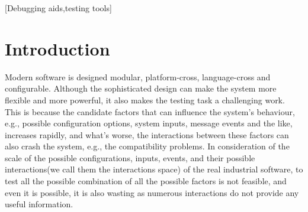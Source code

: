 \documentclass{sig-alternate}
\begin{document}
\begin{abstract}
\end{abstract}

[Debugging aids,testing tools]



\section{Introduction}

Modern software is designed modular, platform-cross, language-cross and configurable. Although the sophisticated design can make the system more flexible and more powerful, it also makes the testing task a challenging work. This is because the candidate factors that can influence the system's behaviour, e.g., possible configuration options, system inputs, message events and the like, increases rapidly, and what's worse, the interactions between these factors can also crash the system, e.g., the compatibility problems. In consideration of the scale of the possible configurations, inputs, events, and their possible interactions(we call them the interactions space) of the real industrial software, to test all the possible combination of all the possible factors is not feasible, and even it is possible, it is also wasting as numerous interactions do not provide any useful information.
\end{document}
